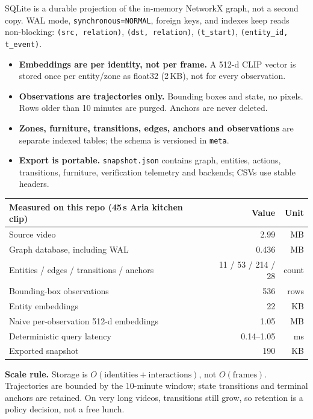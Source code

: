 \documentclass[10pt,a4paper]{article}
\newcommand{\code}[1]{\texttt{\small #1}}
\begin{document}
SQLite is a durable projection of the in-memory NetworkX graph, not a second copy.
WAL mode, \code{synchronous=NORMAL}, foreign keys, and indexes keep reads
non-blocking: \code{(src, relation)}, \code{(dst, relation)},
\code{(t\_start)}, \code{(entity\_id, t\_event)}.

\begin{itemize}[leftmargin=1.1em,itemsep=1pt,topsep=1pt]
  \item \textbf{Embeddings are per identity, not per frame.} A 512-d CLIP vector is stored once
  per entity/zone as float32 (2\,KB), not for every observation.
  \item \textbf{Observations are trajectories only.} Bounding boxes and state, no pixels. Rows
  older than 10 minutes are purged. Anchors are never deleted.
  \item \textbf{Zones, furniture, transitions, edges, anchors and observations} are separate
  indexed tables; the schema is versioned in \code{meta}.
  \item \textbf{Export is portable.} \code{snapshot.json} contains graph, entities, actions,
  transitions, furniture, verification telemetry and backends; CSVs use stable headers.
\end{itemize}

\begin{center}
\small
\begin{tabularx}{\linewidth}{@{}Xrr@{}}
\toprule
\textbf{Measured on this repo (45\,s Aria kitchen clip)} & \textbf{Value} & \textbf{Unit} \\
\midrule
Source video & 2.99 & MB \\
Graph database, including WAL & 0.436 & MB \\
Entities / edges / transitions / anchors & 11 / 53 / 214 / 28 & count \\
Bounding-box observations & 536 & rows \\
Entity embeddings & 22 & KB \\
Naive per-observation 512-d embeddings & 1.05 & MB \\
Deterministic query latency & 0.14--1.05 & ms \\
Exported snapshot & 190 & KB \\
\bottomrule
\end{tabularx}
\end{center}

\textbf{Scale rule.} Storage is $O(\text{identities} + \text{interactions})$, not
$O(\text{frames})$. Trajectories are bounded by the 10-minute window; state transitions and
terminal anchors are retained. On very long videos, transitions still grow, so retention is a
policy decision, not a free lunch.
\end{document}
